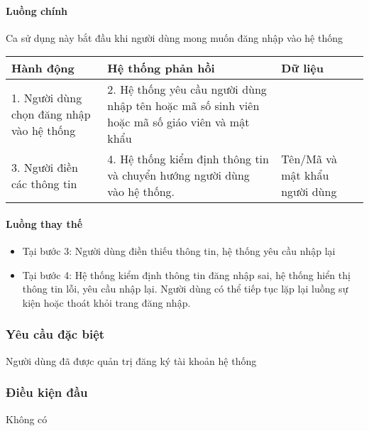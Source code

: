 \documentclass[./../main_file.tex]{subfiles}
\begin{document}
		\paragraph{Luồng chính}
		
		Ca sử dụng này bắt đầu khi người dùng mong muốn đăng nhập vào hệ thống
		\begin{table}[H]
			\begin{tabular}{|p{.33\textwidth}|p{}|p{}|}

				\hline
				\textbf{Hành động}                        & \textbf{Hệ thống phản hồi}                                                                    & \textbf{Dữ liệu}              
				\\ \hline
				1. Người dùng chọn đăng nhập vào hệ thống & 2. Hệ thống yêu cầu người dùng nhập tên hoặc mã số sinh viên hoặc mã số giáo viên và mật khẩu &                               
				\\ \hline
				3. Người điền các thông tin               & 4. Hệ thống kiểm định thông tin và chuyển hướng người dùng vào hệ thống.                      & Tên/Mã và mật khẩu người dùng 
				\\ \hline
				
			\end{tabular}
		\end{table}
		\paragraph{Luồng thay thế}
		\begin{itemize}
			\item Tại bước 3: Người dùng điền thiếu thông tin, hệ thống yêu cầu nhập lại
			\item Tại bước 4:  Hệ thống kiểm định thông tin đăng nhập sai, hệ thống hiển thị thông tin lỗi, yêu cầu nhập lại. Người dùng có thể tiếp tục lặp lại luồng sự kiện hoặc thoát khỏi trang đăng nhập.
			
		\end{itemize}
	\subsubsection{Yêu cầu đặc biệt}
	Người dùng đã được quản trị đăng ký tài khoản hệ thống
	
	\subsubsection{Điều kiện đầu}
	Không có
	
\end{document}
